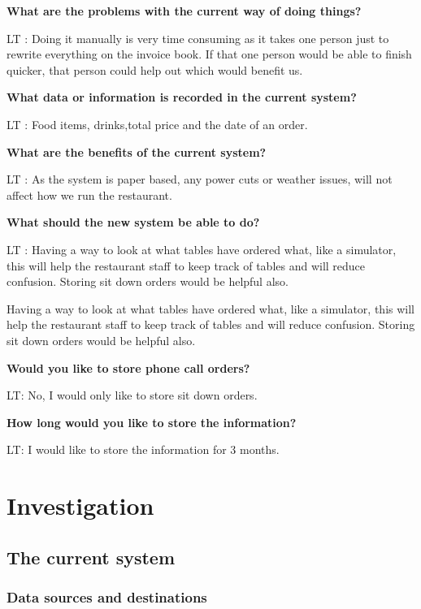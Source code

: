 \textbf{What are the problems with the current way of doing things?}

LT : Doing it manually is very time consuming as it takes one person just to rewrite everything on the invoice book. If that one person would be able to finish quicker, that person could help out which would benefit us. 

\textbf{What data or information is recorded in the current system?}

LT : Food items, drinks,total price and the date of an order.

\textbf{What are the benefits of the current system?}

LT : As the system is paper based, any power cuts or weather issues, will not affect how we run the restaurant.

\textbf{What should the new system be able to do?}

LT : Having a way to look at what tables have ordered what, like a simulator, this will help the restaurant staff to keep track of tables and will reduce confusion. Storing sit down orders would be helpful also.

Having a way to look at what tables have ordered what, like a simulator, this will help the restaurant staff to keep track of tables and will reduce confusion. Storing sit down orders would be helpful also.

\textbf{Would you like to store phone call orders?}

LT: No, I would only like to store sit down orders.

\textbf{How long would you like to store the information?}

LT: I would like to store the information for 3 months.


\section{Investigation}

\subsection{The current system}

\subsubsection{Data sources and destinations}

